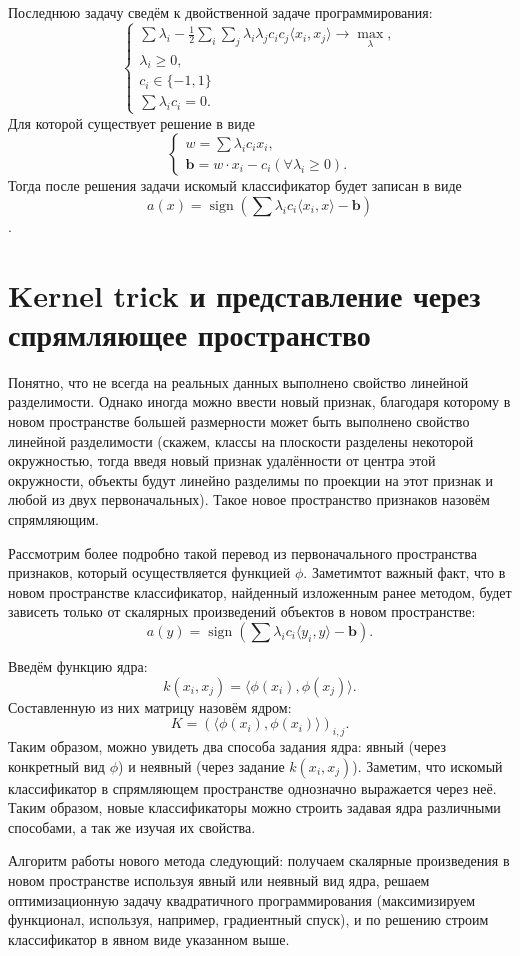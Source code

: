 \documentclass[twoside,twocolumn]{article}
\theoremstyle{plain}
\theoremstyle{definition}
\DeclareMathOperator{\sign}{sign}
\begin{document}
Последнюю задачу сведём к двойственной задаче программирования:
\[
\begin{cases}
\sum \lambda_i - \frac{1}{2}\sum_i \sum_j \lambda_i \lambda_j c_i c_j \langle x_i, x_j\rangle \xrightarrow{} \max_{\lambda}, \\
\lambda_i \geq 0, \\
c_i \in \{-1, 1\} \\
\sum \lambda_i c_i = 0.
\end{cases}
\]
Для которой существует решение в виде
\[
\begin{cases}
w = \sum \lambda_i c_i x_i, \\
\mathbf{b} = w \cdot x_i - c_i (\forall \lambda_i \geq 0).
\end{cases}
\]
Тогда после решения задачи искомый классификатор будет записан в виде
\[ a(x) = \sign(\sum \lambda_i c_i \langle x_i, x \rangle - \mathbf{b})\].

\section{Kernel trick и представление через спрямляющее пространство}
Понятно, что не всегда на реальных данных выполнено свойство линейной разделимости. Однако иногда можно ввести новый признак, благодаря которому в новом пространстве большей размерности может быть выполнено свойство линейной разделимости (скажем, классы на плоскости разделены некоторой окружностью, тогда введя новый признак удалённости от центра этой окружности, объекты будут линейно разделимы по проекции на этот признак и любой из двух первоначальных). Такое новое пространство признаков назовём спрямляющим. \par
Рассмотрим более подробно такой перевод из первоначального пространства признаков, который осуществляется функцией $\phi$. Заметимтот важный факт, что в новом пространстве классификатор, найденный изложенным ранее методом, будет зависеть только от скалярных произведений объектов в новом пространстве:
\[ a(y) = \sign(\sum \lambda_i c_i \langle y_i, y \rangle - \mathbf{b}). \]\par
Введём функцию ядра:
\[k(x_i, x_j) = \langle \phi(x_i), \phi(x_j) \rangle.\]
Составленную из них матрицу назовём ядром:
\[K = (\langle \phi(x_i), \phi(x_i) \rangle )_{i, j}.\]
Таким образом, можно увидеть два способа задания ядра: явный (через конкретный вид $\phi$) и неявный (через задание $k(x_i, x_j)$). Заметим, что  искомый классификатор в спрямляющем пространстве однозначно выражается через неё. Таким образом, новые классификаторы можно строить задавая ядра различными способами, а так же изучая их свойства. \par
Алгоритм работы нового метода следующий: получаем скалярные произведения в новом пространстве используя явный или неявный вид ядра, решаем оптимизационную задачу квадратичного программирования (максимизируем функционал, используя, например, градиентный спуск), и по решению строим классификатор в явном виде указанном выше.
\end{document}
